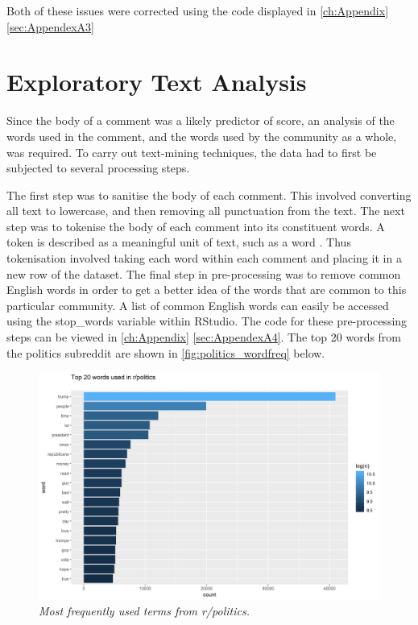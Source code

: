 Both of these issues were corrected using the code displayed in \autoref{ch:Appendix} \autoref{sec:AppendexA3}


\section {Exploratory Text Analysis}
\label{sec:ETA}

Since the body of a comment was a likely predictor of score, an analysis of the words used in the comment, and the words used by the community as a whole, was required. To carry out text-mining techniques, the data had to first be subjected to several processing steps.

The first step was to sanitise the body of each comment. This involved converting all text to lowercase, and then removing all punctuation from the text. The next step was to tokenise the body of each comment into its constituent words. A token is described as a meaningful unit of text, such as a word \cite{21, 22}. Thus tokenisation involved taking each word within each comment and placing it in a new row of the dataset. The final step in pre-processing was to remove common English words in order to get a better idea of the words that are common to this particular community. A list of common English words can easily be accessed using the stop\_words variable within RStudio. The code for these pre-processing steps can be viewed in \autoref{ch:Appendix} \autoref{sec:AppendexA4}. The top 20 words from the politics subreddit are shown in \autoref{fig:politics_wordfreq} below.

\begin{figure}[H]
    \centering
    \includegraphics[width=1.0\textwidth]{graphs/politics_top_20.png}
    \caption{\textit{Most frequently used terms from r/politics. }}
    \label{fig:politics_wordfreq}
\end{figure}

